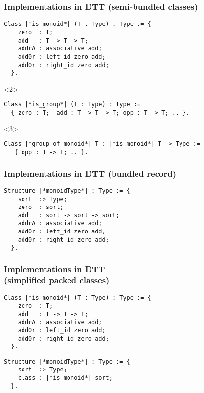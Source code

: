 \documentclass[11pt]{beamer}
\begin{document}
\begin{frame}[fragile]
  \frametitle{Implementations in DTT (semi-bundled classes)}

\begin{lstlisting}
Class |*is_monoid*| (T : Type) : Type := {
    zero  : T;
    add   : T -> T -> T;
    addrA : associative add;
    add0r : left_id zero add;
    add0r : right_id zero add;
  }.
\end{lstlisting}

\vfill
  \begin{onlyenv}<2>
\begin{lstlisting}
Class |*is_group*| (T : Type) : Type :=
  { zero : T;  add : T -> T -> T; opp : T -> T; .. }.
\end{lstlisting}
  \end{onlyenv}
  \begin{onlyenv}<3>
\begin{lstlisting}
Class |*group_of_monoid*| T : |*is_monoid*| T -> Type :=
   { opp : T -> T; .. }.
\end{lstlisting}
  \end{onlyenv}

\end{frame}

\begin{frame}[fragile]
  \frametitle{Implementations in DTT (bundled record)}

\begin{lstlisting}
Structure |*monoidType*| : Type := {
    sort  :> Type;
    zero  : sort;
    add   : sort -> sort -> sort;
    addrA : associative add;
    add0r : left_id zero add;
    add0r : right_id zero add;
  }.
\end{lstlisting}


\end{frame}
\begin{frame}[fragile]
  \frametitle{Implementations in DTT \\ \hfill (simplified packed classes)}

\begin{lstlisting}
Class |*is_monoid*| (T : Type) : Type := {
    zero  : T;
    add   : T -> T -> T;
    addrA : associative add;
    add0r : left_id zero add;
    add0r : right_id zero add;
  }.
\end{lstlisting}

\vfill

\begin{lstlisting}
Structure |*monoidType*| : Type := {
    sort  :> Type;
    class : |*is_monoid*| sort;
  }.
\end{lstlisting}


\end{frame}
\end{document}
